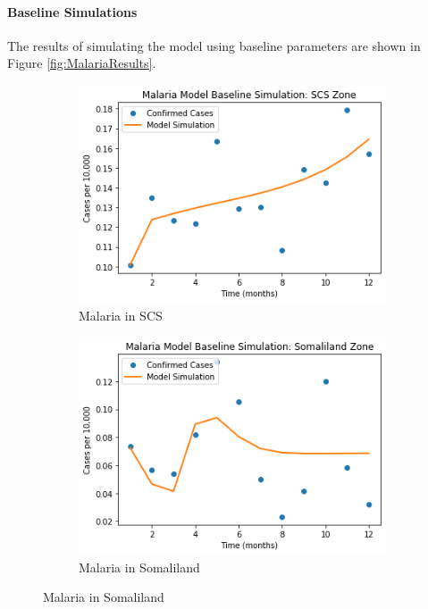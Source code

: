 \documentclass[letter,12pt, usenames,dvipsnames]{article}
\begin{document}
\pagebreak 

\paragraph{Baseline Simulations}
The results of simulating the model using baseline parameters are shown in Figure \ref{fig:MalariaResults}.


\begin{figure}[h!]
     \centering
     \begin{subfigure}[b]{0.37\textwidth}
         \centering
         \includegraphics[width=\textwidth]{MalariaSCS.png}
         \caption{Malaria in SCS}
     \end{subfigure}
     \hfill
     \begin{subfigure}[b]{0.37\textwidth}
         \centering
         \includegraphics[width=\textwidth]{MalariaSomaliland.png}
         \caption{Malaria in Somaliland}
    \hfill
     \end{subfigure}
     

\end{figure}
\end{document}
